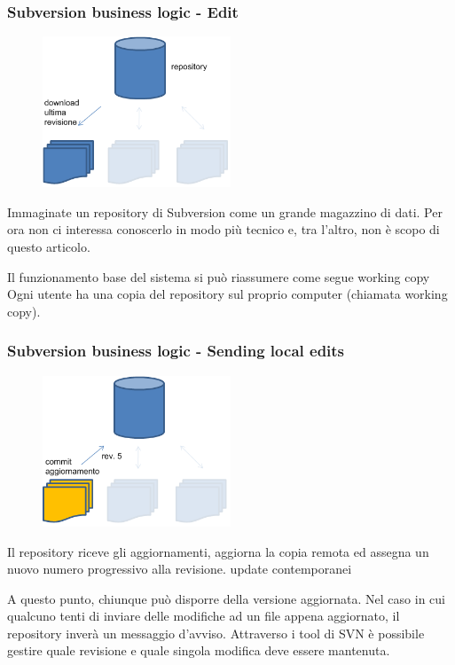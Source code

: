\documentclass[10pt]{beamer}
\begin{document}
\begin{frame}[fragile]
\frametitle{Subversion business logic - Edit}
\begin{figure}[h]
 \centering
 \includegraphics[width=0.5\textwidth]{images/svn-step1.png}
\end{figure}
Immaginate un repository di Subversion come un grande magazzino di dati.
Per ora non ci interessa conoscerlo in modo più tecnico e, tra l’altro, non è scopo di questo articolo.

Il funzionamento base del sistema si può riassumere come segue
working copy
Ogni utente ha una copia del repository sul proprio computer (chiamata working copy).
\end{frame}

\begin{frame}[fragile]
\frametitle{Subversion business logic - Sending local edits}
\begin{figure}[h]
 \centering
 \includegraphics[width=0.5\textwidth]{images/svn-step2.png}
\end{figure}
Il repository riceve gli aggiornamenti, aggiorna la copia remota ed assegna un nuovo numero progressivo alla revisione.
update contemporanei

A questo punto, chiunque può disporre della versione aggiornata. Nel caso in cui qualcuno tenti di inviare delle modifiche ad un file appena aggiornato, il repository inverà un messaggio d’avviso.
Attraverso i tool di SVN è possibile gestire quale revisione e quale singola modifica deve essere mantenuta.
\end{frame}
\end{document}
